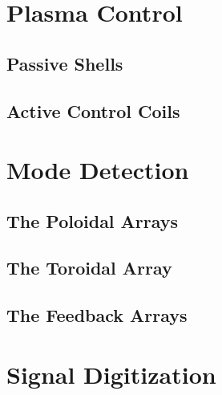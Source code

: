 \section{Plasma Control}
\subsection{Passive Shells}
\subsection{Active Control Coils}
\section{Mode Detection}
\subsection{The Poloidal Arrays}
\subsection{The Toroidal Array}
\subsection{The Feedback Arrays}
\section{Signal Digitization}